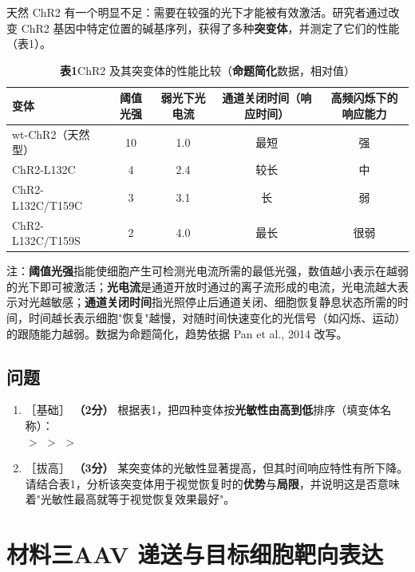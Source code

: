 \documentclass[UTF8,a4paper,11pt]{ctexart}
\newcommand{\pt}[1]{\textbf{（#1分）}}
\newcommand{\lv}[1]{{\small\color{deepgreen}［#1］}}
\newcommand{\key}[1]{\textbf{\color{deepred}#1}}
\newcommand{\tian}[1]{\underline{\hspace{#1}}}
\begin{document}
天然 ChR2 有一个明显不足：需要在较强的光下才能被有效激活。研究者通过改变 ChR2 基因中特定位置的碱基序列，获得了多种\textbf{突变体}，并测定了它们的性能（表1）。

\begin{table}[H]
\centering\small
\caption*{\textbf{表1}\quad ChR2 及其突变体的性能比较（\key{命题简化}数据，相对值）}
\begin{tabular}{@{}lcccc@{}}
\toprule
\textbf{变体} & \textbf{阈值光强} & \textbf{弱光下光电流} & \textbf{通道关闭时间（响应时间）} & \textbf{高频闪烁下的响应能力} \\
\midrule
wt-ChR2（天然型） & 10 & 1.0 & 最短 & 强 \\
ChR2-L132C & 4 & 2.4 & 较长 & 中 \\
ChR2-L132C/T159C & 3 & 3.1 & 长 & 弱 \\
ChR2-L132C/T159S & 2 & 4.0 & 最长 & 很弱 \\
\bottomrule
\end{tabular}

\smallskip
\parbox{0.94\textwidth}{\footnotesize 注：\textbf{阈值光强}指能使细胞产生可检测光电流所需的最低光强，数值越小表示在越弱的光下即可被激活；\textbf{光电流}是通道开放时通过的离子流形成的电流，光电流越大表示对光越敏感；\textbf{通道关闭时间}指光照停止后通道关闭、细胞恢复静息状态所需的时间，时间越长表示细胞"恢复"越慢，对随时间快速变化的光信号（如闪烁、运动）的跟随能力越弱。数据为命题简化，趋势依据 Pan et al., 2014 改写。}
\end{table}

\subsection*{问题}

\begin{enumerate}[leftmargin=2.2em,itemsep=5pt,start=3]
\item \lv{基础} \pt{2} 根据表1，把四种变体按\textbf{光敏性由高到低}排序（填变体名称）：\\
\tian{2.6cm} $>$ \tian{2.6cm} $>$ \tian{2.6cm} $>$ \tian{2.6cm}

\item \lv{拔高} \pt{3} 某突变体的光敏性显著提高，但其时间响应特性有所下降。请结合表1，分析该突变体用于视觉恢复时的\textbf{优势}与\textbf{局限}，并说明这是否意味着"光敏性最高就等于视觉恢复效果最好"。
\end{enumerate}

\section{材料三\quad AAV 递送与目标细胞靶向表达}
\end{document}
